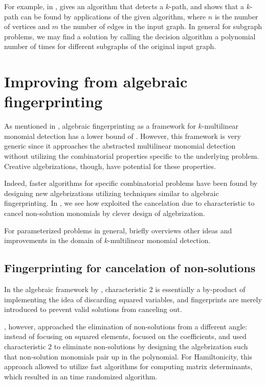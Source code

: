 For example, in \cite{Koutis08}, 
\citeauthor{Koutis08} gives an algorithm that detects a $k$-path, and shows that a 
$k$-path can be found by  applications of the given
algorithm, where $n$ is the number of vertices and $m$ the number of edges in the input graph. 
In general for subgraph problems, we may find a solution by calling the decision 
algorithm a polynomial number of times for different subgraphs of the original input graph.

\section{Improving from algebraic fingerprinting}
\label{sect:improvements}

As mentioned in , 
algebraic fingerprinting as a framework 
for $k$-multilinear monomial detection has a lower bound of . 
However, this framework is very generic since it 
approaches the abstracted multilinear monomial detection without 
utilizing the combinatorial properties specific to the underlying problem. 
Creative algebrizations, though, 
have potential for  these properties.

Indeed, faster algorithms for specific combinatorial problems 
have been found by designing new algebrizations utilizing techniques 
similar to algebraic fingerprinting. In , 
we see how \textcite{Björklund14} 
exploited the cancelation due to characteristic to cancel non-solution monomials 
by clever design of algebrization. 

For parameterized problems in general, 
briefly overviews other ideas and 
improvements in the domain of $k$-multilinear monomial detection.

\subsection{Fingerprinting for cancelation of non-solutions}
\label{sect:cancel_nonsolutions}

In the algebraic framework by \citeauthor{KouWil09}, 
characteristic 2 is essentially a by-product of implementing 
the idea of discarding squared variables, and fingerprints are merely 
introduced to prevent valid solutions from canceling out.

\textcite{Björklund14}, however, approached the elimination of 
non-solutions from a different angle: instead of focusing on squared elements, 
\citeauthor{Björklund14} focused on the coefficients, 
and used characteristic 2 to eliminate non-solutions by designing 
the algebrization such that non-solution monomials pair up in the polynomial. 
For Hamiltonicity, this approach allowed \citeauthor{Björklund14} to utilize 
fast algorithms for computing matrix determinants, which resulted in an 
 time randomized algorithm.

